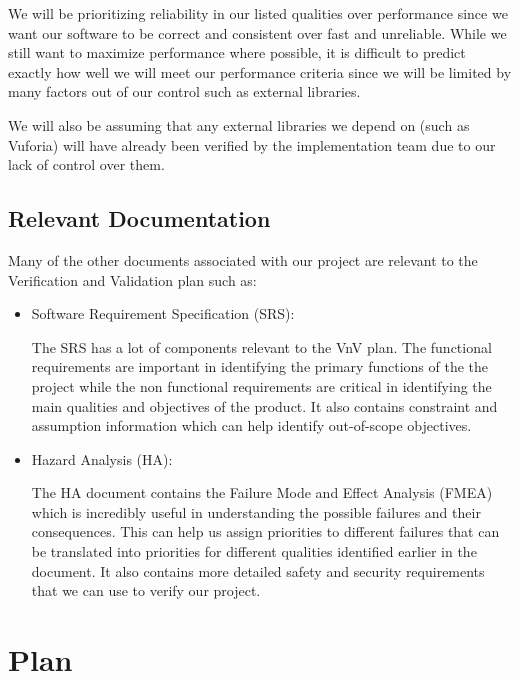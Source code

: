\documentclass[12pt, titlepage]{article}
\begin{document}
We will be prioritizing reliability in our listed qualities over performance since we want our software to be correct and consistent over fast and unreliable. While we still want to maximize performance where possible, it is difficult to predict exactly how well we will meet our performance criteria since we will be limited by many factors out of our control such as external libraries.

We will also be assuming that any external libraries we depend on (such as Vuforia) will have already been verified by the implementation team due to our lack of control over them. 


\subsection{Relevant Documentation}





Many of the other documents associated with our project are relevant to the Verification and Validation plan such as:

\begin{itemize}
    \item Software Requirement Specification (SRS):
          
          The SRS has a lot of components relevant to the VnV plan. The functional requirements are important in identifying the primary functions of the the project while the non functional requirements are critical in identifying the main qualities and objectives of the product. It also contains constraint and assumption information which can help identify out-of-scope objectives.

          \citet{SRS}
    \item Hazard Analysis (HA):
    
        The HA document contains the Failure Mode and Effect Analysis (FMEA) which is incredibly useful in understanding the possible failures and their consequences. This can help us assign priorities to different failures that can be translated into priorities for different qualities identified earlier in the document. It also contains more detailed safety and security requirements that we can use to verify our project.

        \citet{HA}
\end{itemize}


\section{Plan}
\end{document}
